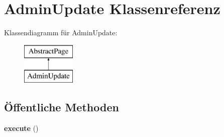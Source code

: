 \hypertarget{class_admin_update}{}\section{Admin\+Update Klassenreferenz}
\label{class_admin_update}
Klassendiagramm für Admin\+Update\+:\begin{figure}[H]
\begin{center}
\leavevmode
\includegraphics[height=2.000000cm]{class_admin_update}
\end{center}
\end{figure}
\subsection*{Öffentliche Methoden}
\begin{DoxyCompactItemize}
\item 
\mbox{\label{class_admin_update_a31ac965d40bb6dd1bf45bdf2ef61c811}} 
{\bfseries execute} ()
\end{DoxyCompactItemize}
